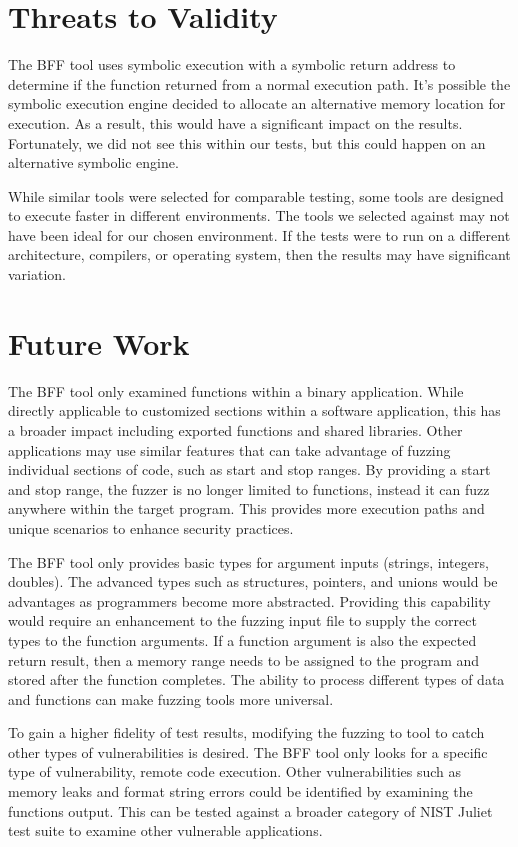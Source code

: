 \documentclass[conference]{IEEEtran}
\begin{document}
\section{Threats to Validity}
The BFF tool uses symbolic execution with a symbolic return address to determine if the function returned from a normal execution path. It's possible the symbolic execution engine decided to allocate an alternative memory location for execution. As a result, this would have a significant impact on the results. Fortunately, we did not see this within our tests, but this could happen on an alternative symbolic engine. 

While similar tools were selected for comparable testing, some tools are designed to execute faster in different environments. The tools we selected against may not have been ideal for our chosen environment. If the tests were to run on a different architecture, compilers, or operating system, then the results may have significant variation. 

\section{Future Work}
The BFF tool only examined functions within a binary application. While directly applicable to customized sections within a software application, this has a broader impact including exported functions and shared libraries. Other applications may use similar features that can take advantage of fuzzing individual sections of code, such as start and stop ranges. By providing a start and stop range, the fuzzer is no longer limited to functions, instead it can fuzz anywhere within the target program. This provides more execution paths and unique scenarios to enhance security practices. 

The BFF tool only provides basic types for argument inputs (strings, integers, doubles). The advanced types such as structures, pointers, and unions would be advantages as programmers become more abstracted. Providing this capability would require an enhancement to the fuzzing input file to supply the correct types to the function arguments. If a function argument is also the expected return result, then a memory range needs to be assigned to the program and stored after the function completes. The ability to process different types of data and functions can make fuzzing tools more universal. 

To gain a higher fidelity of test results, modifying the fuzzing to tool to catch other types of vulnerabilities is desired. The BFF tool only looks for a specific type of vulnerability, remote code execution. Other vulnerabilities such as memory leaks and format string errors could be identified by examining the functions output. This can be tested against a broader category of NIST Juliet test suite to examine other vulnerable applications. 
\end{document}
